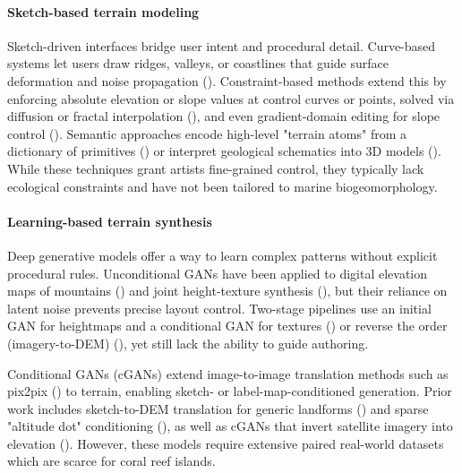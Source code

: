 \paragraph{Sketch-based terrain modeling}
Sketch-driven interfaces bridge user intent and procedural detail. Curve-based systems let users draw ridges, valleys, or coastlines that guide surface deformation and noise propagation (\cite{Gain2009,Hnaidi2010}). Constraint-based methods extend this by enforcing absolute elevation or slope values at control curves or points, solved via diffusion or fractal interpolation (\cite{Gasch2020,Talgorn2018}), and even gradient-domain editing for slope control (\cite{Guerin2022}). Semantic approaches encode high-level "terrain atoms" from a dictionary of primitives (\cite{Genevaux2015}) or interpret geological schematics into 3D models (\cite{Natali2012}). While these techniques grant artists fine-grained control, they typically lack ecological constraints and have not been tailored to marine biogeomorphology.

\paragraph{Learning-based terrain synthesis}
Deep generative models offer a way to learn complex patterns without explicit procedural rules. Unconditional GANs have been applied to digital elevation maps of mountains (\cite{WulffJensen2018}) and joint height-texture synthesis (\cite{Spick2019}), but their reliance on latent noise prevents precise layout control. Two-stage pipelines use an initial GAN for heightmaps and a conditional GAN for textures (\cite{Beckham2017}) or reverse the order (imagery-to-DEM) (\cite{Panagiotou2020}), yet still lack the ability to guide authoring.

Conditional GANs (cGANs) extend image-to-image translation methods such as pix2pix (\cite{Isola2017}) to terrain, enabling sketch- or label-map-conditioned generation. Prior work includes sketch-to-DEM translation for generic landforms (\cite{Guerin2017}) and sparse "altitude dot" conditioning (\cite{Voulgaris2021}), as well as cGANs that invert satellite imagery into elevation (\cite{Sisodia2022}). However, these models require extensive paired real-world datasets which are scarce for coral reef islands.



